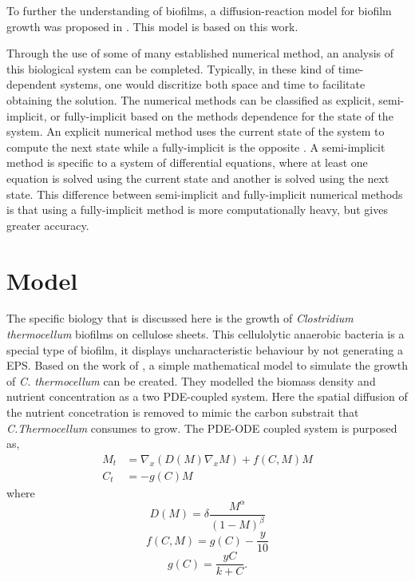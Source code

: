 \documentclass{article}
\theoremstyle{plain}
\begin{document}
  To further the understanding of biofilms, a diffusion-reaction model for biofilm growth was proposed in \cite{eberl2001deterministic}.
  This model is based on this work.
  
  Through the use of some of many established numerical method, an analysis of this biological system can be completed.
  Typically, in these kind of time-dependent systems, one would discritize both space and time to facilitate obtaining the solution. 
  The numerical methods can be classified as explicit, semi-implicit, or fully-implicit based on the methods dependence for the state of the system.
  An explicit numerical method uses the current state of the system to compute the next state while a fully-implicit is the opposite \cite{butcher2008methods}.
  A semi-implicit method is specific to a system of differential equations, where at least one equation is solved using the current state and another is solved using the next state. 
  This difference between semi-implicit and fully-implicit numerical methods is that using a fully-implicit method is more computationally heavy, but gives greater accuracy.

  

\section{Model}
  The specific biology that is discussed here is the growth of \textit{Clostridium thermocellum} biofilms on cellulose sheets.
  This cellulolytic anaerobic bacteria is a special type of biofilm, it displays uncharacteristic behaviour by not generating a EPS.
  Based on the work of \cite{dumitrache2014understanding}, a simple mathematical model to simulate the growth of \textit{C. thermocellum} can be created.
  They modelled the biomass density and nutrient concentration as a two PDE-coupled system. 
  Here the spatial diffusion of the nutrient concetration is removed to mimic the carbon substrait that \textit{C.Thermocellum} consumes to grow. 
  The PDE-ODE coupled system is purposed as,
  \begin{align} 
     M_t &= \nabla_x \left(  {D}(M) \nabla_x M \right) + {f}({C},M) M \label{equ:model_M}\\
     {C}_t &= -{g}({C}) M \label{equ:model_C}
  \end{align}
  where
  \begin{equation} \label{equ:model_D}
    {D}(M) = {\delta} \frac{M^\alpha}{(1-M)^\beta}
  \end{equation}
  \begin{equation} \label{equ:model_f}
    {f}({C},M) = {g}({C}) - \frac{y}{10} 
  \end{equation}
  \begin{equation} \label{equ:model_g}
    {g}({C}) = \frac{{y} {C}}{{k} + {C}}.
  \end{equation}
  
\end{document}

